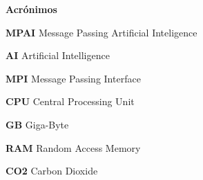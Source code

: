 %
%
%






\begin{flushleft}
	\huge{\textbf{Acrónimos}}
\end{flushleft}

\vspace{1cm}

\textbf{MPAI} Message Passing Artificial Inteligence
\vspace{0.5cm}

\textbf{AI} Artificial Intelligence
\vspace{0.5cm}

\textbf{MPI} Message Passing Interface 
\vspace{0.5cm}

\textbf{CPU} Central Processing Unit
\vspace{0.5cm}

\textbf{GB} Giga-Byte 
\vspace{0.5cm}

\textbf{RAM} Random Access Memory
\vspace{0.5cm}

\textbf{CO2} Carbon Dioxide
\vspace{0.5cm}

